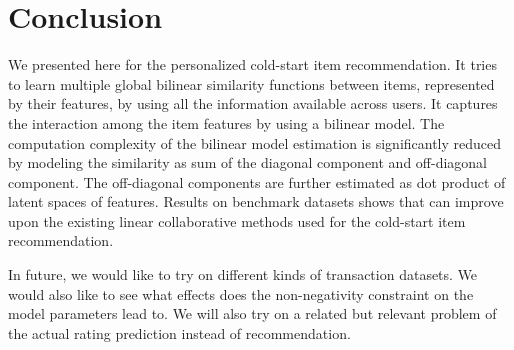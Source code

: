 \section{Conclusion} \label{ch:bilinear:conclusion}
We presented here \CF for the personalized cold-start \TOPN item recommendation.
It tries to learn multiple global bilinear similarity functions between items, 
represented by their features, by
using all the information available across users. It captures the
interaction among the item features by using a bilinear model.
The computation complexity of the bilinear model estimation is significantly reduced by
modeling the similarity as sum of the diagonal component and off-diagonal component.
The off-diagonal components are further estimated as dot product of latent spaces of
features. Results on benchmark datasets shows that \CF can improve upon the existing
linear collaborative methods used for the cold-start item recommendation. 


In future, we would like to try \CF on
different kinds of transaction datasets. We would also like to see what effects
does the non-negativity constraint on
the model parameters lead to. We will also try \CF on a related but relevant problem
of the actual rating prediction instead of \TOPN recommendation.

